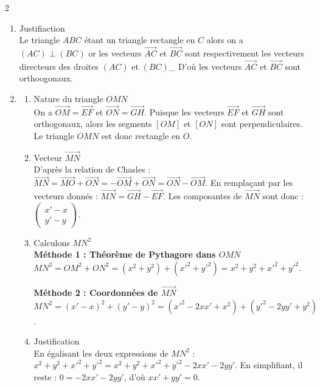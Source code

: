 \begin{multicols*}{2}
\begin{enumerate}
  		\item Justifiaction\\
  		Le triangle $ ABC $ étant un triangle rectangle en $ C $ alors on a $ (AC)\perp (BC) $ or les vecteurs $ \overrightarrow{AC} $ et $ \overrightarrow{BC} $ sont respectivement les vecteurs directeurs des droites $ (AC) $  et $ (BC) $\_
  		D'où les vecteurs $ \overrightarrow{AC} $  et $ \overrightarrow{BC} $  sont orthoogonaux.
  		\item \begin{enumerate}
  			\item Nature du triangle $ OMN $\\
  			On a $ \overrightarrow{OM} =  \overrightarrow{EF}$ et $ \overrightarrow{ON} =  \overrightarrow{GH}$. Puisque les vecteurs $ \overrightarrow{EF}$ et $ \overrightarrow{GH}$ sont orthogonaux, alors les segments $[OM]$ et $[ON]$ sont perpendiculaires. Le triangle $OMN$ est donc rectangle en $O$.
  			\item Vecteur $ \overrightarrow{MN}$ \\
  			D'après la relation de Chasles :
  			$ \overrightarrow{MN} =  \overrightarrow{MO} +  \overrightarrow{ON} = - \overrightarrow{OM} +  \overrightarrow{ON} =  \overrightarrow{ON} -  \overrightarrow{OM}$.
  			En remplaçant par les vecteurs donnés : $ \overrightarrow{MN} =  \overrightarrow{GH} -  \overrightarrow{EF}$.
  			Les composantes de $ \overrightarrow{MN}$ sont donc : $\begin{pmatrix} x' - x \\ y' - y \end{pmatrix}$.
  			\item  Calculons $ MN^2 $\\
  			\textbf{Méthode 1 : Théorème de Pythagore dans $OMN$} \\
  			$MN^2 = OM^2 + ON^2 = (x^2 + y^2) + (x'^2 + y'^2) = x^2 + y^2 + x'^2 + y'^2$.
  			
  			\textbf{Méthode 2 : Coordonnées de $ \overrightarrow{MN}$} \\
  			$MN^2 = (x' - x)^2 + (y' - y)^2 = (x'^2 - 2xx' + x^2) + (y'^2 - 2yy' + y^2)$.
  			\item Justification\\
  			En égalisant les deux expressions de $MN^2$ :
  			$x^2 + y^2 + x'^2 + y'^2 = x^2 + y^2 + x'^2 + y'^2 - 2xx' - 2yy'$.
  			En simplifiant, il reste : $0 = -2xx' - 2yy'$, d'où $xx' + yy' = 0$.
  		\end{enumerate}
  		

\end{enumerate}
\end{multicols*}
